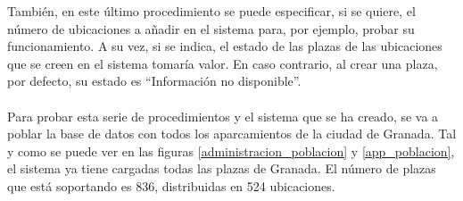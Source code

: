 También, en este último procedimiento se puede especificar, si se quiere, el número de ubicaciones a añadir en el sistema para, por ejemplo, probar su funcionamiento. A su vez, si se indica, el estado de las plazas de las ubicaciones que se creen en el sistema tomaría valor. En caso contrario, al crear una plaza, por defecto, su estado es ``Información no disponible''.
\\\\
Para probar esta serie de procedimientos y el sistema que se ha creado, se va a poblar la base de datos con todos los aparcamientos de la ciudad de Granada.
Tal y como se puede ver en las figuras \ref{administracion_poblacion} y \ref{app_poblacion}, el sistema ya tiene cargadas todas las plazas de Granada. El número de plazas que está soportando es 836, distribuidas en 524 ubicaciones.
